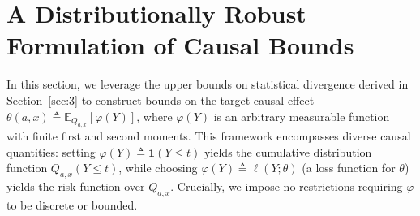 
\section{A Distributionally Robust Formulation of Causal Bounds} \label{sec:4}
In this section, we leverage the upper bounds on statistical divergence derived in Section~\ref{sec:3} to construct bounds on the target causal effect $\theta(a,x) \triangleq \mathbb{E}_{Q_{a,x}}[\varphi(Y)]$, where $\varphi(Y)$ is an arbitrary measurable function with finite first and second moments. This framework encompasses diverse causal quantities: setting $\varphi(Y) \triangleq \boldsymbol{1}(Y \leq t)$ yields the cumulative distribution function $Q_{a,x}(Y \leq t)$, while choosing $\varphi(Y) \triangleq \ell(Y;\theta)$ (a loss function for $\theta$) yields the risk function over $Q_{a,x}$. Crucially, we impose no restrictions requiring $\varphi$ to be discrete or bounded.

